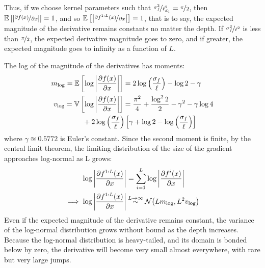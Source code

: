 \documentclass[twoside]{article}
\begin{document}
Thus, if we choose kernel parameters such that $\nicefrac{\sigma^2_f}{\ell_{d_1}^2} = \nicefrac{\pi}{2}$, then $\mathbb{E}_{} \left[ {\left| \nicefrac{\partial f(x)}{\partial x} \right|} \right] = 1$, and so $\mathbb{E}_{} \left[ {\left| \nicefrac{\partial f^{1:L}(x)}{\partial x} \right|} \right] = 1$, that is to say, the expected magnitude of the derivative remains constants no matter the depth.  If $\nicefrac{\sigma^2_f}{\ell^2}$ is less than $\nicefrac{\pi}{2}$, the expected derivative magnitude goes to zero, and if greater, the expected magnitude goes to infinity as a function of $L$.  

The log of the magnitude of the derivatives has moments:
\begin{align}
m_{\log} = \expectargs{}{\log \left| \frac{\partial f(x)}{\partial x} \right|} & = 2 \log \left( \frac{\sigma_f}{\ell} \right) - \log2 - \gamma \\
v_{\log} = \varianceargs{}{\log \left| \frac{\partial f(x)}{\partial x} \right|} & = \frac{\pi^2}{4} + \frac{\log^2 2}{2}  - \gamma^2 - \gamma \log4 \nonumber \\
& \hspace{-2cm} + 2 \log\left(\frac{\sigma_f}{\ell}\right) \left[ \gamma + \log2 - \log \left(\frac{\sigma_f}{\ell}\right) \right]
\end{align}
where $\gamma \approxeq 0.5772$ is Euler's constant.  Since the second moment is finite, by the central limit theorem, the limiting distribution of the size of the gradient approaches log-normal as L grows:
\begin{align}
\log \left| \frac{\partial f^{1:L}(x)}{\partial x} \right| 
& = \sum_{i=1}^L \log \left| \frac{\partial f^i(x)}{\partial x} \right| \nonumber \\
 \implies
\log \left| \frac{\partial f^{1:L}(x)}{\partial x} \right| & \distas{L \rightarrow \infty} \Nt{ L m_{\log} }{L^2 v_{\log}}
\end{align}
%
Even if the expected magnitude of the derivative remains constant, the variance of the log-normal distribution grows without bound as the depth increases.  Because the log-normal distribution is heavy-tailed, and its domain is bonded below by zero, the derivative will become very small almost everywhere, with rare but very large jumps.  
\end{document}

